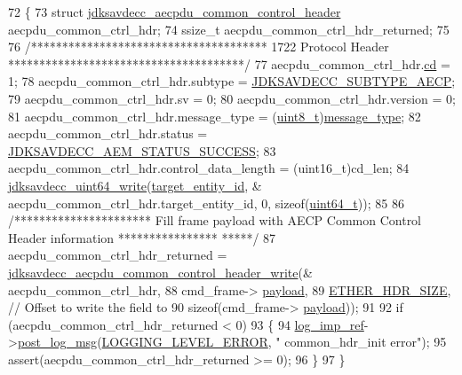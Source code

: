 \begin{DoxyCode}
72 \{
73     \textcolor{keyword}{struct }\hyperlink{structjdksavdecc__aecpdu__common__control__header}{jdksavdecc\_aecpdu\_common\_control\_header} 
      aecpdu\_common\_ctrl\_hdr;
74     ssize\_t aecpdu\_common\_ctrl\_hdr\_returned;
75 
76     \textcolor{comment}{/************************************** 1722 Protocol Header **************************************/}
77     aecpdu\_common\_ctrl\_hdr.\hyperlink{structjdksavdecc__aecpdu__common__control__header_a8bdacfca3faaf5f7d020bbe533855525}{cd} = 1;
78     aecpdu\_common\_ctrl\_hdr.subtype = \hyperlink{group__subtype_ga4f1d76227a738f442d15ebaf2253b6b3}{JDKSAVDECC\_SUBTYPE\_AECP};
79     aecpdu\_common\_ctrl\_hdr.sv = 0;
80     aecpdu\_common\_ctrl\_hdr.version = 0;
81     aecpdu\_common\_ctrl\_hdr.message\_type = (\hyperlink{stdint_8h_aba7bc1797add20fe3efdf37ced1182c5}{uint8\_t})\hyperlink{structjdksavdecc__aecpdu__common__control__header_aeaaffeace8c23899e558022f62ce6de4}{message\_type};
82     aecpdu\_common\_ctrl\_hdr.status = \hyperlink{group__aecpdu__aem__status_gaa4d43ea279e119485de1282522a7fb67}{JDKSAVDECC\_AEM\_STATUS\_SUCCESS};
83     aecpdu\_common\_ctrl\_hdr.control\_data\_length = (uint16\_t)cd\_len;
84     \hyperlink{group__endian_gaa294fd85c2d887032dad294c6833c903}{jdksavdecc\_uint64\_write}(\hyperlink{structjdksavdecc__aecpdu__common__control__header_a6928214f4610ef10e95ba5c74ac5b06e}{target\_entity\_id}, &
      aecpdu\_common\_ctrl\_hdr.target\_entity\_id, 0, \textcolor{keyword}{sizeof}(\hyperlink{parse_8c_aec6fcb673ff035718c238c8c9d544c47}{uint64\_t}));
85 
86     \textcolor{comment}{/********************** Fill frame payload with AECP Common Control Header information ****************
      *****/}
87     aecpdu\_common\_ctrl\_hdr\_returned = 
      \hyperlink{group__aecpdu_ga828eb506e6ecb72b56d72cd4e4fd433a}{jdksavdecc\_aecpdu\_common\_control\_header\_write}(&
      aecpdu\_common\_ctrl\_hdr,
88                                                                                     cmd\_frame->
      \hyperlink{structjdksavdecc__frame_a220ad076814a31ae0163e722e523de46}{payload},
89                                                                                     
      \hyperlink{namespaceavdecc__lib_a6c827b1a0d973e18119c5e3da518e65ca9512ad9b34302ba7048d88197e0a2dc0}{ETHER\_HDR\_SIZE}, \textcolor{comment}{// Offset to write the field to}
90                                                                                     \textcolor{keyword}{sizeof}(cmd\_frame->
      \hyperlink{structjdksavdecc__frame_a220ad076814a31ae0163e722e523de46}{payload}));
91 
92     \textcolor{keywordflow}{if} (aecpdu\_common\_ctrl\_hdr\_returned < 0)
93     \{
94         \hyperlink{namespaceavdecc__lib_acbe3e2a96ae6524943ca532c87a28529}{log\_imp\_ref}->\hyperlink{classavdecc__lib_1_1log_a68139a6297697e4ccebf36ccfd02e44a}{post\_log\_msg}(\hyperlink{namespaceavdecc__lib_a501055c431e6872ef46f252ad13f85cdaf2c4481208273451a6f5c7bb9770ec8a}{LOGGING\_LEVEL\_ERROR}, \textcolor{stringliteral}{"
      common\_hdr\_init error"});
95         assert(aecpdu\_common\_ctrl\_hdr\_returned >= 0);
96     \}
97 \}
\end{DoxyCode}


